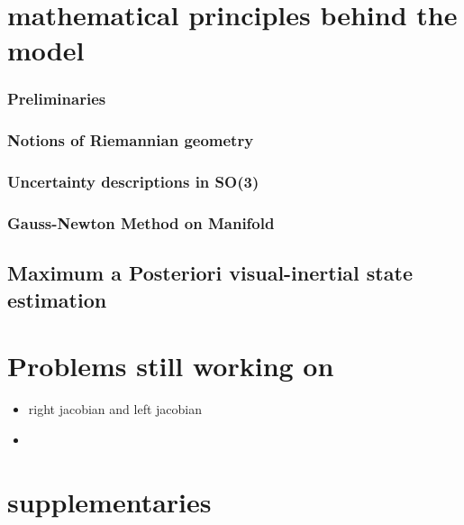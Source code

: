 \documentclass[10pt,a4paper]{article}
\begin{document}
\subsection{}
\subsection{}

\section{mathematical principles behind the model}
\subsubsection{Preliminaries}
\subsubsection{Notions of Riemannian geometry}
\subsubsection{Uncertainty descriptions in SO(3)}
\subsubsection{Gauss-Newton Method on Manifold}

\subsection{Maximum a Posteriori visual-inertial state estimation}

\section{Problems still working on}
\begin{itemize}
	\item right jacobian and left jacobian
	\item 
\end{itemize}



\section{supplementaries}
\end{document}
